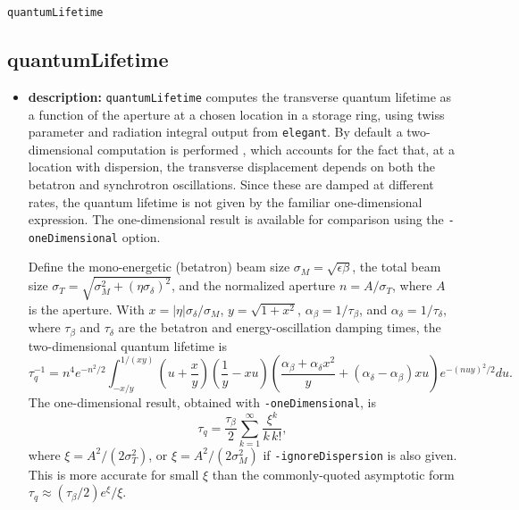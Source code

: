 \documentclass[11pt]{article}
\begin{document}
\newpage
\begin{center}{\Large\verb|quantumLifetime|}\end{center}
\subsection{quantumLifetime}
\label{quantumLifetime}

\begin{itemize}
\item {\bf description:} \verb|quantumLifetime| computes the transverse quantum lifetime as a function of the
aperture at a chosen location in a storage ring, using twiss parameter and radiation integral output from
{\tt elegant}.  By default a two-dimensional computation is performed \cite{Chao-PAC77-1885}, which accounts for
the fact that, at a location with dispersion, the transverse displacement depends on both the betatron and
synchrotron oscillations.  Since these are damped at different rates, the quantum lifetime is not given by the
familiar one-dimensional expression.  The one-dimensional result is available for comparison using the
\verb|-oneDimensional| option.

Define the mono-energetic (betatron) beam size $\sigma_M = \sqrt{\epsilon \beta}$, the total beam size
$\sigma_T = \sqrt{\sigma_M^2 + \left(\eta \sigma_\delta\right)^2}$, and the normalized aperture
$n = A/\sigma_T$, where $A$ is the aperture.  With $x = \left|\eta\right| \sigma_\delta/\sigma_M$,
$y = \sqrt{1+x^2}$, $\alpha_\beta = 1/\tau_\beta$, and $\alpha_\delta = 1/\tau_\delta$, where $\tau_\beta$
and $\tau_\delta$ are the betatron and energy-oscillation damping times, the two-dimensional quantum
lifetime is
\begin{equation}
\tau_q^{-1} = n^4 e^{-n^2/2} \int_{-x/y}^{1/(x y)}
  \left(u + \frac{x}{y}\right)
  \left(\frac{1}{y} - x u\right)
  \left(\frac{\alpha_\beta + \alpha_\delta x^2}{y} + \left(\alpha_\delta - \alpha_\beta\right) x u\right)
  e^{-\left(n u y\right)^2/2} du .
\end{equation}
The one-dimensional result, obtained with \verb|-oneDimensional|, is
\begin{equation}
\tau_q = \frac{\tau_\beta}{2} \sum_{k=1}^{\infty} \frac{\xi^k}{k\, k!},
\end{equation}
where $\xi = A^2/(2 \sigma_T^2)$, or $\xi = A^2/(2 \sigma_M^2)$ if \verb|-ignoreDispersion| is also given.
This is more accurate for small $\xi$ than the commonly-quoted asymptotic form
$\tau_q \approx \left(\tau_\beta/2\right) e^\xi/\xi$.


\end{itemize}
\end{document}
